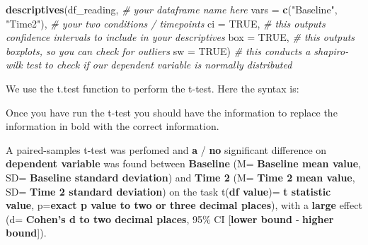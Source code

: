 \documentclass[
]{book}
\newenvironment{Shaded}{\begin{snugshade}}{\end{snugshade}}
\newcommand{\AttributeTok}[1]{\textcolor[rgb]{0.13,0.29,0.53}{#1}}
\newcommand{\CommentTok}[1]{\textcolor[rgb]{0.56,0.35,0.01}{\textit{#1}}}
\newcommand{\ConstantTok}[1]{\textcolor[rgb]{0.56,0.35,0.01}{#1}}
\newcommand{\FunctionTok}[1]{\textcolor[rgb]{0.13,0.29,0.53}{\textbf{#1}}}
\newcommand{\NormalTok}[1]{#1}
\newcommand{\SpecialCharTok}[1]{\textcolor[rgb]{0.81,0.36,0.00}{\textbf{#1}}}
\newcommand{\StringTok}[1]{\textcolor[rgb]{0.31,0.60,0.02}{#1}}
\begin{document}
\begin{Shaded}
\begin{Highlighting}[]
\FunctionTok{descriptives}\NormalTok{(df\_reading, }\CommentTok{\# your dataframe name here}
             \AttributeTok{vars =} \FunctionTok{c}\NormalTok{(}\StringTok{"Baseline"}\NormalTok{, }\StringTok{"Time2"}\NormalTok{), }\CommentTok{\# your two conditions / timepoints}
             \AttributeTok{ci =} \ConstantTok{TRUE}\NormalTok{, }\CommentTok{\# this outputs confidence intervals to include in your descriptives}
             \AttributeTok{box =} \ConstantTok{TRUE}\NormalTok{, }\CommentTok{\# this outputs boxplots, so you can check for outliers}
             \AttributeTok{sw =} \ConstantTok{TRUE}\NormalTok{) }\CommentTok{\# this conducts a shapiro{-}wilk test to check if our dependent variable is normally distributed }
\end{Highlighting}
\end{Shaded}

We use the t.test function to perform the t-test. Here the syntax is:

\begin{Shaded}
\end{Shaded}

Once you have run the t-test you should have the information to replace the information in bold with the correct information.

A paired-samples t-test was perfomed and \textbf{a} / \textbf{no} significant difference on \textbf{dependent variable} was found between \textbf{Baseline} (M= \textbf{Baseline mean value}, SD= \textbf{Baseline standard deviation}) and \textbf{Time 2} (M= \textbf{Time 2 mean value}, SD= \textbf{Time 2 standard deviation}) on the task t(\textbf{df value})= \textbf{t statistic value}, p=\textbf{exact p value to two or three decimal places}), with a \textbf{large} effect (d= \textbf{Cohen's d to two decimal places}, 95\% CI {[}\textbf{lower bound} ‐ \textbf{higher bound}{]}).
\end{document}
